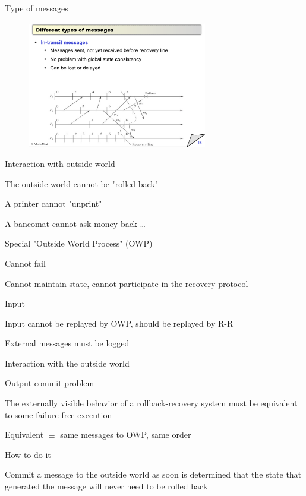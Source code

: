 \begin{frame}{Type of messages}
\begin{overprint}
\begin{figure}
\end{figure}
\begin{figure}
	\includegraphics[width=0.7\textwidth,page=7]{messages}
\end{figure}
\end{overprint}
\end{frame}

\begin{frame}{Interaction with outside world}

\BI
\item The outside world cannot be "rolled back"
	\BI
	\item A printer cannot "unprint"
	\item A bancomat cannot ask money back \ldots
	\EI
\item Special "Outside World Process" (OWP)
	\BI
	\item Cannot fail
	\item Cannot maintain state, cannot participate in the recovery protocol
	\EI
\item Input
	\BI
	\item Input cannot be replayed by OWP, should be replayed by R-R
	\item External messages must be logged
	\EI
\EI

\end{frame}

\begin{frame}{Interaction with the outside world}
\BI
\item Output commit problem
\BI
\item The externally visible behavior of a rollback-recovery system must be equivalent to some failure-free execution
\item Equivalent $\equiv$ same messages to OWP, same order
\EI
\item How to do it
\BI
\item Commit a message to the outside world as soon is determined that the state that generated the message will never need to be rolled back
\EI
\EI
\end{frame}

